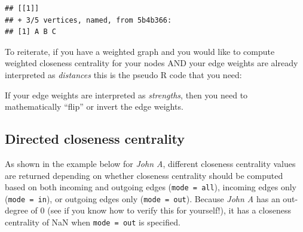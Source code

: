 \documentclass[
]{book}
\newenvironment{Shaded}{\begin{snugshade}}{\end{snugshade}}
\newcommand{\AttributeTok}[1]{\textcolor[rgb]{0.13,0.29,0.53}{#1}}
\newcommand{\CommentTok}[1]{\textcolor[rgb]{0.56,0.35,0.01}{\textit{#1}}}
\newcommand{\DecValTok}[1]{\textcolor[rgb]{0.00,0.00,0.81}{#1}}
\newcommand{\FunctionTok}[1]{\textcolor[rgb]{0.13,0.29,0.53}{\textbf{#1}}}
\newcommand{\NormalTok}[1]{#1}
\newcommand{\SpecialCharTok}[1]{\textcolor[rgb]{0.81,0.36,0.00}{\textbf{#1}}}
\begin{document}
\begin{verbatim}
## [[1]]
## + 3/5 vertices, named, from 5b4b366:
## [1] A B C
\end{verbatim}

To reiterate, if you have a weighted graph and you would like to compute weighted closeness centrality for your nodes AND your edge weights are already interpreted as \emph{distances} this is the pseudo R code that you need:

\begin{Shaded}
\end{Shaded}

If your edge weights are interpreted as \emph{strengths}, then you need to mathematically ``flip'' or invert the edge weights.

\begin{Shaded}
\end{Shaded}

\subsection{Directed closeness centrality}\label{directed-closeness-centrality}

As shown in the example below for \emph{John A}, different closeness centrality values are returned depending on whether closeness centrality should be computed based on both incoming and outgoing edges (\texttt{mode\ =\ \textquotesingle{}all\textquotesingle{}}), incoming edges only (\texttt{mode\ =\ \textquotesingle{}in\textquotesingle{}}), or outgoing edges only (\texttt{mode\ =\ \textquotesingle{}out\textquotesingle{}}). Because \emph{John A} has an out-degree of 0 (see if you know how to verify this for yourself!), it has a closeness centrality of NaN when \texttt{mode\ =\ \textquotesingle{}out\textquotesingle{}} is specified.
\end{document}
